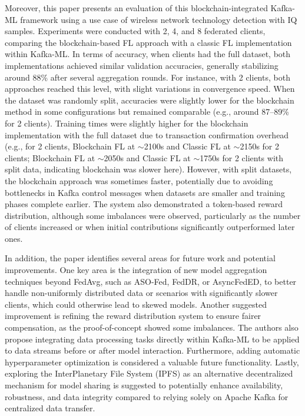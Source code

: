  Moreover, this paper presents an evaluation of this blockchain-integrated Kafka-ML framework using a use case of wireless network technology detection with IQ samples. Experiments were conducted with 2, 4, and 8 federated clients, comparing the blockchain-based FL approach with a classic FL implementation within Kafka-ML. In terms of accuracy, when clients had the full dataset, both implementations achieved similar validation accuracies, generally stabilizing around 88\% after several aggregation rounds. For instance, with 2 clients, both approaches reached this level, with slight variations in convergence speed. When the dataset was randomly split, accuracies were slightly lower for the blockchain method in some configurations but remained comparable (e.g., around 87--89\% for 2 clients). Training times were slightly higher for the blockchain implementation with the full dataset due to transaction confirmation overhead (e.g., for 2 clients, Blockchain FL at $\sim$2100s and Classic FL at $\sim$2150s for 2 clients;  Blockchain FL at $\sim$2050s and Classic FL at $\sim$1750s for 2 clients with split data, indicating blockchain was slower here). However, with split datasets, the blockchain approach was sometimes faster, potentially due to avoiding bottlenecks in Kafka control messages when datasets are smaller and training phases complete earlier. The system also demonstrated a token-based reward distribution, although some imbalances were observed, particularly as the number of clients increased or when initial contributions significantly outperformed later ones. 
 
 In addition, the paper identifies several areas for future work and potential improvements. One key area is the integration of new model aggregation techniques beyond FedAvg, such as ASO-Fed, FedDR, or AsyncFedED, to better handle non-uniformly distributed data or scenarios with significantly slower clients, which could otherwise lead to skewed models. Another suggested improvement is refining the reward distribution system to ensure fairer compensation, as the proof-of-concept showed some imbalances. The authors also propose integrating data processing tasks directly within Kafka-ML to be applied to data streams before or after model interaction. Furthermore, adding automatic hyperparameter optimization is considered a valuable future functionality. Lastly, exploring the InterPlanetary File System (IPFS) as an alternative decentralized mechanism for model sharing is suggested to potentially enhance availability, robustness, and data integrity compared to relying solely on Apache Kafka for centralized data transfer.


